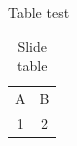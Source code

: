 \documentclass{beamer}
\begin{document}
\begin{frame}{Table test}
\begin{table}
\centering
\begin{tabular}{cc}
A & B \\
1 & 2 \\
\end{tabular}
\caption{Slide table}
\label{tab:slide}
\end{table}
\end{frame}
\end{document}
